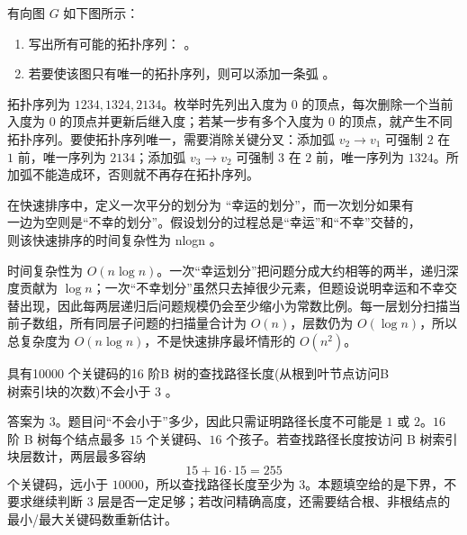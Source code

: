 \begin{question}
有向图 $G$ 如下图所示：

\begin{center}
\end{center}

\begin{enumerate}
  \item 写出所有可能的拓扑序列： \blank。
  \item 若要使该图只有唯一的拓扑序列，则可以添加一条弧 \blank。
\end{enumerate}
\begin{solution}
拓扑序列为 $1234,1324,2134$。枚举时先列出入度为 $0$ 的顶点，每次删除一个当前入度为 $0$ 的顶点并更新后继入度；若某一步有多个入度为 $0$ 的顶点，就产生不同拓扑序列。要使拓扑序列唯一，需要消除关键分叉：添加弧 $v_2\to v_1$ 可强制 $2$ 在 $1$ 前，唯一序列为 $2134$；添加弧 $v_3\to v_2$ 可强制 $3$ 在 $2$ 前，唯一序列为 $1324$。所加弧不能造成环，否则就不再存在拓扑序列。
\end{solution}
\end{question}

\begin{question}
在快速排序中，定义一次平分的划分为 “幸运的划分”，而一次划分如果有\\
一边为空则是“不幸的划分”。假设划分的过程总是“幸运”和“不幸”交替的，\\
则该快速排序的时间复杂性为         nlogn       。\\
\begin{solution}
时间复杂性为 $O(n\log n)$。一次“幸运划分”把问题分成大约相等的两半，递归深度贡献为 $\log n$；一次“不幸划分”虽然只去掉很少元素，但题设说明幸运和不幸交替出现，因此每两层递归后问题规模仍会至少缩小为常数比例。每一层划分扫描当前子数组，所有同层子问题的扫描量合计为 $O(n)$，层数仍为 $O(\log n)$，所以总复杂度为 $O(n\log n)$，不是快速排序最坏情形的 $O(n^2)$。
\end{solution}
\end{question}

\begin{question}
具有10000 个关键码的16 阶B 树的查找路径长度(从根到叶节点访问B\\
树索引块的次数)不会小于   3    。\\
\begin{solution}
答案为 $3$。题目问“不会小于”多少，因此只需证明路径长度不可能是 $1$ 或 $2$。$16$ 阶 B 树每个结点最多 $15$ 个关键码、$16$ 个孩子。若查找路径长度按访问 B 树索引块层数计，两层最多容纳
\[
15+16\cdot15=255
\]
个关键码，远小于 $10000$，所以查找路径长度至少为 $3$。本题填空给的是下界，不要求继续判断 $3$ 层是否一定足够；若改问精确高度，还需要结合根、非根结点的最小/最大关键码数重新估计。
\end{solution}
\end{question}

